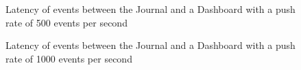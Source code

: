 \begin{figure}
  \begin{center} 
    \caption{Latency of events between the Journal and a Dashboard with a push rate of 500 events per second}
    \label{fig:pushrate500}
  \end{center}
\end{figure}

\begin{figure}
  \begin{center} 
    \caption{Latency of events between the Journal and a Dashboard with a push rate of 1000 events per second}
    \label{fig:pushrate1000}
  \end{center}
\end{figure}

